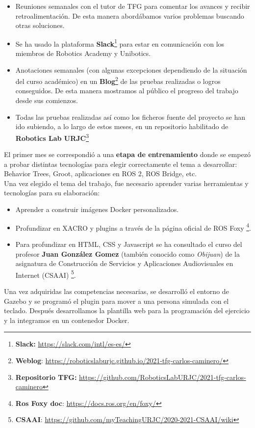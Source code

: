 \begin{itemize}
	\item Reuniones semanales con el tutor de TFG para comentar los avances y recibir retroalimentación. De esta manera abordábamos varios problemas buscando otras soluciones.
	\item Se ha usado la plataforma \textbf{Slack}\footnote{\textbf{Slack:} \url{https://slack.com/intl/es-es/}} para estar en comunicación con los miembros de Robotics Academy y Unibotics.
	\item Anotaciones semanales (con algunas excepciones dependiendo de la situación del curso académico) en un \textbf{Blog}\footnote{\textbf{Weblog}: \url{https://roboticslaburjc.github.io/2021-tfg-carlos-caminero/}} de las pruebas realizadas o logros conseguidos. De esta manera mostramos al público el progreso del trabajo desde sus comienzos.
	\item Todas las pruebas realizadas así como los ficheros fuente del proyecto se han ido subiendo, a lo largo de estos meses, en un repositorio habilitado de \textbf{Robotics Lab URJC}\footnote{\textbf{Repositorio TFG:} \url{https://github.com/RoboticsLabURJC/2021-tfg-carlos-caminero}}
\end{itemize}

El primer mes se correspondió a una \textbf{etapa de entrenamiento} donde se empezó a probar distintas tecnologías para elegir correctamente el tema a desarrollar: Behavior Trees, Groot, aplicaciones en ROS 2, ROS Bridge, etc.\\

Una vez elegido el tema del trabajo, fue necesario aprender varias herramientas y tecnologías para su elaboración:
\begin{itemize}
	\item Aprender a construir imágenes Docker personalizados.
	\item Profundizar en XACRO y plugins a través de la página oficial de ROS Foxy \footnote{\textbf{Ros Foxy doc}: \url{https://docs.ros.org/en/foxy/}}.
	\item Para profundizar en HTML, CSS y Javascript se ha consultado el curso del profesor \textbf{Juan González Gomez} (también conocido como \textit{Obijuan}) de la asignatura de Construcción de Servicios y Aplicaciones Audiovisuales en Internet (CSAAI) \footnote{\textbf{CSAAI}: \url{https://github.com/myTeachingURJC/2020-2021-CSAAI/wiki}}.
\end{itemize}

Una vez adquiridas las competencias necesarias, se desarrolló el entorno de Gazebo y se programó el plugin para mover a una persona simulada con el teclado. Después desarrollamos la plantilla web para la programación del ejercicio y la integramos en un contenedor Docker.\\

